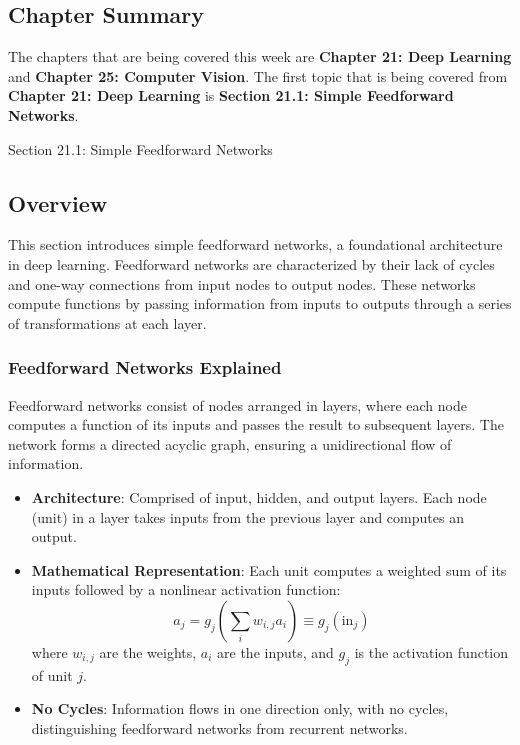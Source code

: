 \newpage

\subsection{Chapter Summary}

The chapters that are being covered this week are \textbf{Chapter 21: Deep Learning} and \textbf{Chapter 25: Computer Vision}. The first topic that is being covered from \textbf{Chapter 21: Deep Learning}
is \textbf{Section 21.1: Simple Feedforward Networks}.

\begin{notes}{Section 21.1: Simple Feedforward Networks}
    \subsection*{Overview}

    This section introduces simple feedforward networks, a foundational architecture in deep learning. Feedforward networks are characterized by their lack of cycles and one-way connections from input 
    nodes to output nodes. These networks compute functions by passing information from inputs to outputs through a series of transformations at each layer.
    
    \subsubsection*{Feedforward Networks Explained}
    
    Feedforward networks consist of nodes arranged in layers, where each node computes a function of its inputs and passes the result to subsequent layers. The network forms a directed acyclic graph, 
    ensuring a unidirectional flow of information.
    
    \begin{highlight}
    
        \begin{itemize}
            \item \textbf{Architecture}: Comprised of input, hidden, and output layers. Each node (unit) in a layer takes inputs from the previous layer and computes an output.
            \item \textbf{Mathematical Representation}: Each unit computes a weighted sum of its inputs followed by a nonlinear activation function:
            \[
            a_j = g_j\left(\sum_{i} w_{i,j}a_i\right) \equiv g_j(\text{in}_j)
            \]
            where $w_{i,j}$ are the weights, $a_i$ are the inputs, and $g_j$ is the activation function of unit $j$.
            \item \textbf{No Cycles}: Information flows in one direction only, with no cycles, distinguishing feedforward networks from recurrent networks.
        \end{itemize}
    

\end{highlight}
\end{notes}
